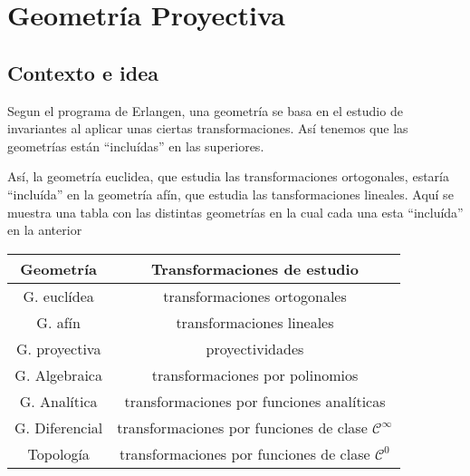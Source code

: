 \chapter{Geometría Proyectiva}
\section{Contexto e idea}
Segun el programa de Erlangen, una geometría se basa en el estudio de invariantes
al aplicar unas ciertas transformaciones. Así tenemos que las geometrías están
``incluídas'' en las superiores.

Así, la geometría euclidea, que estudia las transformaciones ortogonales, estaría
``incluída'' en la geometría afín, que estudia las tansformaciones lineales. Aquí
se muestra una tabla con las distintas geometrías en la cual cada una esta
``incluída'' en la anterior
\begin{center}
    \begin{tabular}{|c|c|}
        \hline Geometría & Transformaciones de estudio \\
        \hline \hline
        G. euclídea  & transformaciones ortogonales \\ \hline
        G. afín & transformaciones lineales \\ \hline
        G. proyectiva & proyectividades \\ \hline
        G. Algebraica & transformaciones por polinomios \\ \hline
        G. Analítica & transformaciones por funciones analíticas \\ \hline
        G. Diferencial & transformaciones por funciones de clase
        $\mathscr{C}^\infty$ \\ \hline
        Topología & transformaciones por funciones de clase $\mathscr{C}^0$\\ \hline
    \end{tabular}
\end{center}
\vfill                                      %

